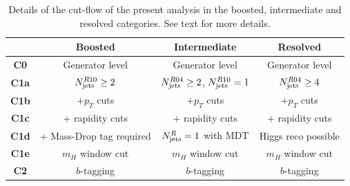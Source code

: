 \begin{table}[t]
  \centering
  \begin{tabular}{|c|c|c|c|}
\hline
&  Boosted  &   Intermediate &  Resolved  \\
\hline
\hline
{\bf C0} &  Generator level &  Generator level & Generator level \\
\hline
{\bf C1a} & $N_{\rm jets}^{R10}\ge 2$ & $N_{\rm jets}^{R04}\ge 2$, $N_{\rm jets}^{R10}=1$  &
 $N_{\rm jets}^{R04}\ge 4$ \\
{\bf  C1b} & +$p_T$ cuts & +$p_T$ cuts
 & +$p_T$ cuts \\
 {\bf C1c} & + rapidity cuts &  + rapidity cuts &
 + rapidity cuts \\
 {\bf C1d} & + Mass-Drop tag required & $N_{\rm jets}^{R}=1$ with MDT  &
  Higgs reco possible \\
{\bf C1e} & $m_H$ window cut & $m_H$ window cut & $m_H$ window cut  \\
\hline
{\bf C2} & $b$-tagging  &  $b$-tagging &  $b$-tagging \\
\hline
  \end{tabular}
  \caption{\small Details of the cut-flow of the present analysis in the boosted, intermediate
    and resolved categories.
    See text for more details.
    \label{tab:cutflowdetails}
  }
\end{table}


